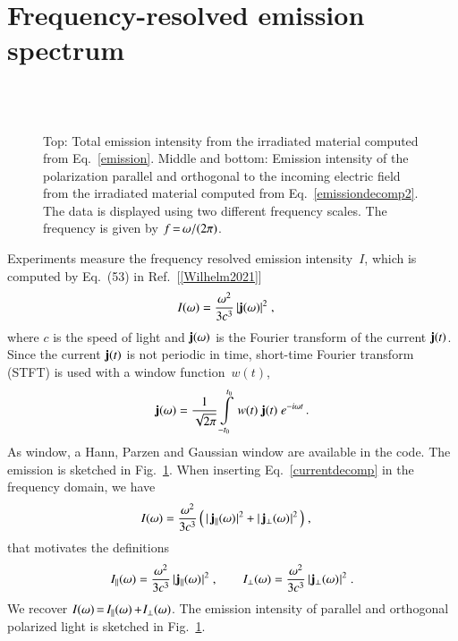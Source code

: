 \documentclass[11pt, a4paper]{scrartcl}
\newlength\figureheight
\newlength\figurewidth
\begin{document}
\section{Frequency-resolved emission spectrum}
\begin{figure}
\centering
\setlength\figureheight{7.0cm} 
\setlength{}

\\[1.0em]

\\[1.0em]
%

\caption{Top: Total emission intensity from the irradiated material computed from Eq.~\eqref{emission}. 
%
Middle and bottom: Emission intensity of the polarization parallel and orthogonal to the incoming electric field from the irradiated material computed from Eq.~\eqref{emissiondecomp2}.
%
The data is displayed using two different frequency scales. 
%
The frequency is given by $f\,{=}\,\omega/(2\pi)$.
}
    \label{fig:emission}
\end{figure}

Experiments measure the  frequency resolved emission intensity~$I$, which is computed by Eq.~(53) in Ref.~[\ref{Wilhelm2021}]
\begin{align}
I(\omega) &=
\frac{\omega^2}{3c^3}\,|\mathbf{j}(\omega)|^2\;, \label{emission}
\end{align}
where $c$ is the speed of light and $\mathbf{j}(\omega)$ is the Fourier transform of the current $\mathbf{j}(t)$.
%
Since the current $\mathbf{j}(t)$ is not periodic in time, short-time Fourier transform (STFT) is used with a window function~$w(t)$,
\begin{align}
    \mathbf{j}(\omega) = \frac{1}{\sqrt{2\pi}}\int\limits_{-t_0}^{t_0}\,w(t)\;\mathbf{j}(t)\;e^{-i\omega t}\,.
\end{align}
%
As window, a Hann, Parzen and Gaussian window are available in the code. 
%
The emission is sketched in Fig.~\ref{fig:emission}.
%
%
When inserting Eq.~\eqref{currentdecomp} in the frequency domain, we have
\begin{align}
I(\omega) &=
\frac{\omega^2}{3c^3}\,\Big(\,|\,\mathbf{j}_\parallel(\omega)\hspace{0.05em}|^2
+ |\,\mathbf{j}_\bot(\omega)\hspace{0.05em}|^2 \,\Big)
\;, \label{emissiondecomp}
\end{align}
that motivates the definitions
\begin{align}
I_\parallel(\omega) =
\frac{\omega^2}{3c^3}\, |\hspace{0.05em}\mathbf{j}_\parallel(\omega)\hspace{0.05em}|^2\;,
\hspace{2em}
I_\bot(\omega) =
\frac{\omega^2}{3c^3}\, |\hspace{0.05em}\mathbf{j}_\bot(\omega)\hspace{0.05em}|^2\;. \label{emissiondecomp2}
\end{align}
We recover $I(\omega)\,{=}\, I_\parallel(\omega)\,{+}\hspace{0.05em} I_\bot(\omega)$.
%
The emission intensity of parallel and orthogonal polarized light is sketched in Fig.~\ref{fig:emission}.
\end{document}
